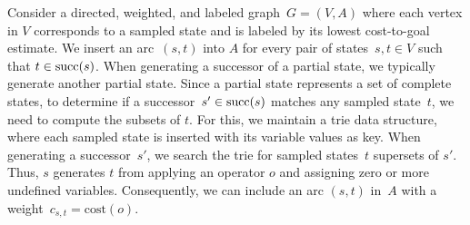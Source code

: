 





Consider a directed, weighted, and labeled graph~$G=(V,A)$ where each vertex in $V$ corresponds to a sampled state and is labeled by its lowest cost-to-goal estimate. We insert an arc~$(s,t)$ into $A$ for every pair of states~$s,t \in V$ such that $t \in \operatorname{succ}(s)$. When generating a successor of a partial state, we typically generate another partial state. Since a partial state represents a set of complete states, to determine if a successor~$s' \in \operatorname{succ}(s)$ matches any sampled state~$t$, we need to compute the subsets of $t$. For this, we maintain a trie data structure, where each sampled state is inserted with its variable values as key. When generating a successor~$s'$, we search the trie for sampled states~$t$ supersets of $s'$. Thus, $s$ generates $t$ from applying an operator $o$ and assigning zero or more undefined variables. Consequently, we can include an arc $(s, t)$ in~$A$ with a weight~$c_{s,t} = \text{cost}(o)$.

